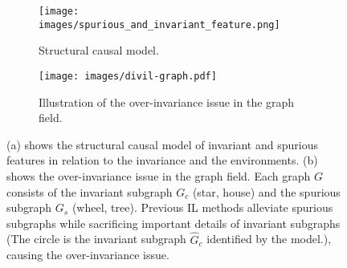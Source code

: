 \begin{figure}[t]
    \centering
    \begin{subfigure}{0.24\textwidth}
        \centering
\texttt{[image: images/spurious\_and\_invariant\_feature.png]}
	\caption{Structural causal model.}
	\label{fig:scm}
    \end{subfigure}
    \hfill
    \begin{subfigure}{0.73\textwidth}
        \centering
        \texttt{[image: images/divil-graph.pdf]}
        \caption{Illustration of the over-invariance issue in the graph field.}
        \label{fig:over-invariance illu}
    \end{subfigure}
    \caption{(a) shows the structural causal model of invariant and spurious features in relation to the invariance and the environments. (b) shows the over-invariance issue in the graph field. Each graph $G$ consists of the invariant subgraph $G_c$ (star, house) and the spurious subgraph $G_s$ (wheel, tree). Previous IL methods alleviate spurious subgraphs while sacrificing important details of invariant subgraphs (The circle is the invariant subgraph $\hat{G}_c$ identified by the model.), causing the over-invariance issue.
    }
    \label{fig:twosubs}
\end{figure}

